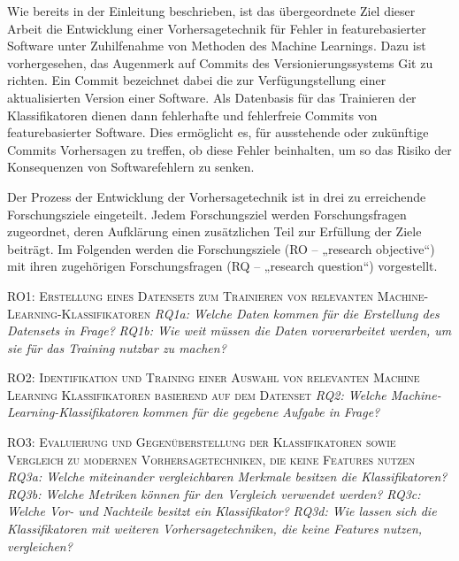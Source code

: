 Wie bereits in der Einleitung beschrieben, ist das übergeordnete Ziel dieser Arbeit die Entwicklung einer Vorhersagetechnik für Fehler in featurebasierter Software unter Zuhilfenahme von Methoden des Machine Learnings. Dazu ist vorhergesehen, das Augenmerk auf Commits des Versionierungssystems Git zu richten. Ein Commit bezeichnet dabei die zur Verfügungstellung einer aktualisierten Version einer Software. Als Datenbasis für das Trainieren der Klassifikatoren dienen dann fehlerhafte und fehlerfreie Commits von featurebasierter Software. Dies ermöglicht es, für ausstehende oder zukünftige Commits Vorhersagen zu treffen, ob diese Fehler beinhalten, um so das Risiko der Konsequenzen von Softwarefehlern zu senken.

Der Prozess der Entwicklung der Vorhersagetechnik ist in drei zu erreichende Forschungsziele eingeteilt. Jedem Forschungsziel werden Forschungsfragen zugeordnet, deren Aufklärung einen zusätzlichen Teil zur Erfüllung der Ziele beiträgt. Im Folgenden werden die Forschungsziele (RO – „research objective“) mit ihren zugehörigen Forschungsfragen (RQ – „research question“) vorgestellt.

\label{research_objectives}
\begin{flushleft}
\textsc{RO1: Erstellung eines Datensets zum Trainieren von relevanten Machine-
Learning-Klassifikatoren}\medskip\linebreak 
\emph{RQ1a: Welche Daten kommen für die Erstellung des Datensets in Frage?}\linebreak
\emph{RQ1b: Wie weit müssen die Daten vorverarbeitet werden, um sie für das Training nutzbar zu machen?}

\textsc{RO2: Identifikation und Training einer Auswahl von relevanten Machine Learning Klassifikatoren basierend auf dem Datenset}\medskip\linebreak 
\emph{RQ2: Welche Machine-Learning-Klassifikatoren kommen für die gegebene Aufgabe in Frage?}

\textsc{RO3: Evaluierung und Gegenüberstellung der Klassifikatoren sowie Vergleich zu modernen Vorhersagetechniken, die keine Features nutzen}\medskip\linebreak 
\emph{RQ3a: Welche miteinander vergleichbaren Merkmale besitzen die Klassifikatoren?}\linebreak 
\emph{RQ3b: Welche Metriken können für den Vergleich verwendet werden?}\linebreak 
\emph{RQ3c: Welche Vor- und Nachteile besitzt ein Klassifikator?}\linebreak 
\emph{RQ3d: Wie lassen sich die Klassifikatoren mit weiteren Vorhersagetechniken, die keine Features nutzen, vergleichen?}
\end{flushleft}

